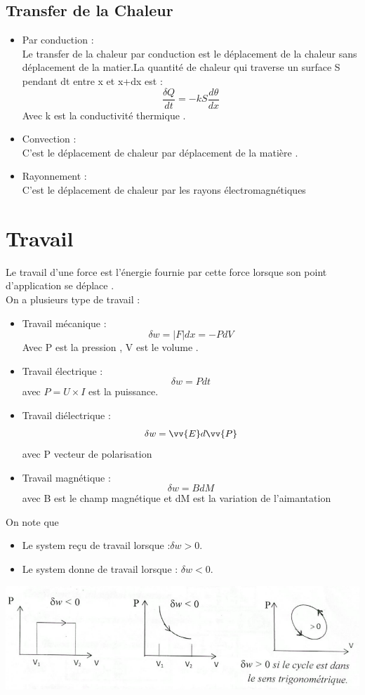 \documentclass[12pt,oneside]{book}
\begin{document}
\subsection{Transfer de la Chaleur}
\begin{itemize}
    \item Par conduction :\\
          Le transfer de la chaleur par conduction est le déplacement de la chaleur sans déplacement de la matier.La quantité de chaleur qui traverse un surface S pendant dt entre x et x+dx est :\\
          \[\boxed{\frac{\delta Q}{dt} = -kS\frac{d\theta}{dx}}\]
          Avec k est la conductivité thermique .
    \item Convection :\\
          C'est le déplacement de chaleur par déplacement de la matière .
    \item Rayonnement :\\
          C'est le déplacement de chaleur par les rayons électromagnétiques
\end{itemize}
\section{Travail}
Le travail d'une force est l'énergie fournie par cette force lorsque son point d'application se déplace .\\
On a plusieurs type de travail :
\begin{itemize}
    \item Travail mécanique :\\
          \[\boxed{\delta w = |F|dx = -PdV}\]
          Avec P est la pression , V est le volume .
    \item Travail électrique : \\
          \[\delta w = Pdt\]
          avec $P = U\times I$ est la puissance.
    \item Travail diélectrique : \\
          \[\delta w = \vv{E} d\vv{P}\]
          avec P vecteur de polarisation
    \item Travail magnétique :\\
          \[\delta w = B dM\]
          avec B est le champ magnétique et dM est la variation de l'aimantation
\end{itemize}
On note que
\begin{itemize}
    \item Le system reçu de travail lorsque :$\delta w > 0$.
    \item Le system donne de travail lorsque : $\delta w < 0$.
\end{itemize}
\begin{center}
    \includegraphics[width=0.8\linewidth]{../pic/3300/1.png}
\end{center}
\end{document}
